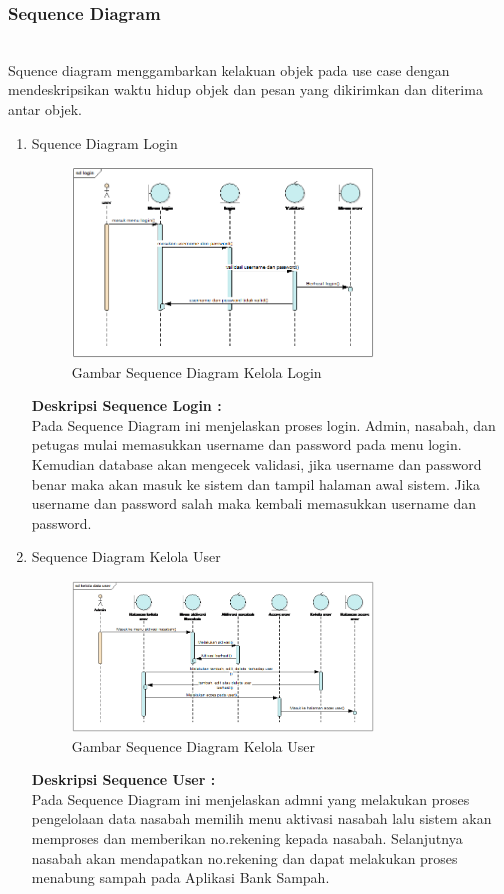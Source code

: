 \subsubsection{Sequence Diagram}
\hfill\\
Squence diagram menggambarkan kelakuan objek pada use case dengan mendeskripsikan waktu hidup objek dan pesan yang dikirimkan dan diterima antar objek.
\begin{enumerate}
\item Squence Diagram Login
\hfill\\
	\begin{figure}[H]
		\includegraphics[width=8cm]{figures/analisis/6.png}
		\centering
		\caption{Gambar Sequence Diagram Kelola Login}
	\end{figure}
\textbf{Deskripsi Sequence Login :}
\hfill\\
Pada Sequence Diagram ini menjelaskan proses login. Admin, nasabah, dan petugas mulai memasukkan username dan password pada menu login. Kemudian database akan mengecek validasi, jika username dan password benar maka akan masuk ke sistem dan tampil halaman awal sistem. Jika username dan password salah maka kembali memasukkan username dan password.

\item Sequence Diagram Kelola User
\hfill\\
	\begin{figure}[H]
		\includegraphics[width=8cm]{figures/analisis/7.png}
		\centering
		\caption{Gambar Sequence Diagram Kelola User}
	\end{figure}
\textbf{Deskripsi Sequence User :}
\hfill\\
Pada Sequence Diagram ini menjelaskan admni yang melakukan proses pengelolaan data nasabah memilih menu aktivasi nasabah lalu sistem akan memproses dan memberikan no.rekening kepada nasabah. Selanjutnya nasabah akan mendapatkan no.rekening dan dapat melakukan proses menabung sampah pada Aplikasi Bank Sampah.


\end{enumerate}
